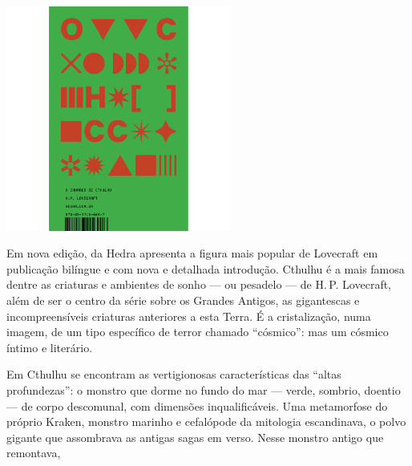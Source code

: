 \begin{center}
\hspace*{-3.6cm}
\hspace*{3.1cm}\includegraphics[width=74mm]{./grid/lovecraft.png}
\end{center}

\hspace*{-7cm}\hrulefill\hspace*{-7cm}

\medskip

\noindent{}Em nova edição, {} da Hedra apresenta a figura mais popular de Lovecraft em publicação bilíngue e com nova e detalhada introdução. Cthulhu é a mais famosa dentre as criaturas e ambientes de sonho --- ou pesadelo --- de H.\,P. Lovecraft, além de ser o centro da série sobre os Grandes Antigos, as gigantescas e incompreensíveis criaturas anteriores a esta Terra. É a cristalização, numa imagem, de um tipo específico de terror chamado ``cósmico'': mas um cósmico íntimo e literário.

Em Cthulhu se encontram as vertigionosas características das ``altas profundezas'': o monstro que dorme no fundo do mar --- verde, sombrio, doentio --- de corpo descomunal, com dimensões inqualificáveis. Uma metamorfose do próprio Kraken, monstro marinho e cefalópode da mitologia escandinava, o polvo gigante que assombrava as antigas sagas em verso. Nesse monstro antigo que remontava, 

\vfill

\hspace*{-.4cm}\begin{minipage}[c]{.5\linewidth}
\small{
{}}
\end{minipage}

